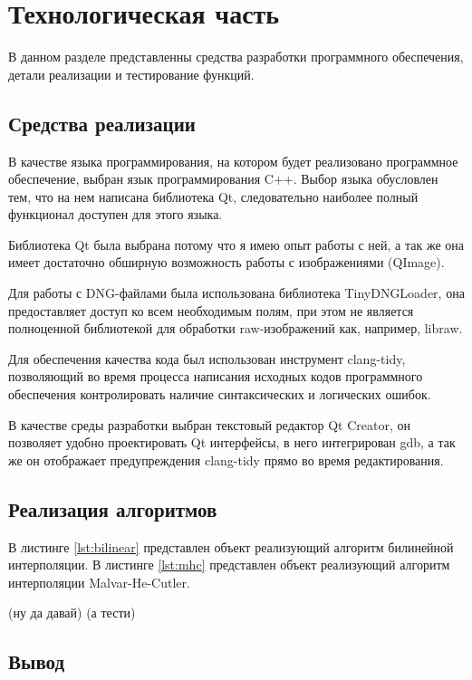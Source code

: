 \chapter{Технологическая часть}

В данном разделе представленны средства разработки программного обеспечения, детали реализации и тестирование функций.

\section{Средства реализации}

В качестве языка программирования, на котором будет реализовано программное обеспечение, выбран язык программирования C++. Выбор языка обусловлен тем, что на нем написана библиотека Qt, следовательно наиболее полный функционал доступен для этого языка. 

Библиотека Qt была выбрана потому что я имею опыт работы с ней, а так же она имеет достаточно обширную возможность работы с изображениями (QImage).

Для работы с DNG-файлами была использована библиотека TinyDNGLoader, она предоставляет доступ ко всем необходимым полям, при этом не является полноценной библиотекой для обработки raw-изображений как, например, libraw.

Для обеспечения качества кода был использован инструмент clang-tidy, позволяющий во время процесса написания исходных кодов программного обеспечения контролировать наличие синтаксических и логических ошибок.

В качестве среды разработки выбран текстовый редактор Qt Creator, он позволяет удобно проектировать Qt интерфейсы, в него интегрирован gdb, а так же он отображает предупреждения clang-tidy прямо во время редактирования.

\section{Реализация алгоритмов}

В листинге \ref{lst:bilinear} представлен объект реализующий алгоритм билинейной интерполяции. В листинге \ref{lst:mhc} представлен объект реализующий алгоритм интерполяции Malvar-He-Cutler.

(ну да давай)
(а тести)

\section*{Вывод}

